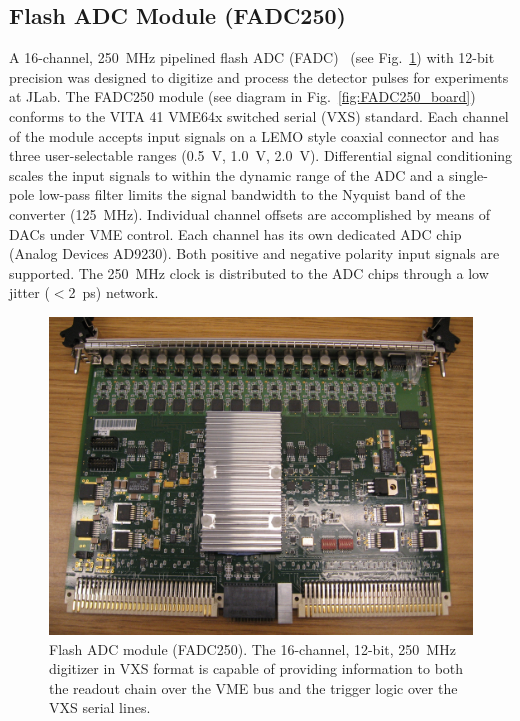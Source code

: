 \subsection{Flash ADC Module (FADC250)}

A 16-channel, 250~MHz pipelined flash ADC (FADC)~\cite{fadc-ref} (see Fig.~\ref{fig:FADC250pic}) with 12-bit
precision was designed to digitize and process the detector pulses for experiments at JLab. The FADC250 module (see
diagram in Fig.~\ref{fig:FADC250_board}) conforms to the VITA 41 VME64x switched serial (VXS) standard. Each
channel of the module accepts input signals on a LEMO style coaxial connector and has three user-selectable ranges
(0.5~V, 1.0~V, 2.0~V).  Differential signal conditioning scales the input signals to within the dynamic range of the ADC
and a single-pole low-pass filter limits the signal bandwidth to the Nyquist band of the converter (125~MHz). Individual
channel offsets are accomplished by means of DACs under VME control.  Each channel has its own dedicated ADC chip
(Analog Devices AD9230). Both positive and negative polarity input signals are supported. The 250~MHz clock is
distributed to the ADC chips through a low jitter ($<$2~ps) network.  

\begin{figure}[hbt]
	\centering
	\includegraphics[width=1.0\columnwidth,keepaspectratio]{img/FADC250pic.jpg}
	\caption{Flash ADC module (FADC250). The 16-channel, 12-bit, 250~MHz digitizer in VXS format is capable of
          providing information to both the readout chain over the VME bus and the trigger logic over the VXS serial lines.}
	\label{fig:FADC250pic}
\end{figure}

